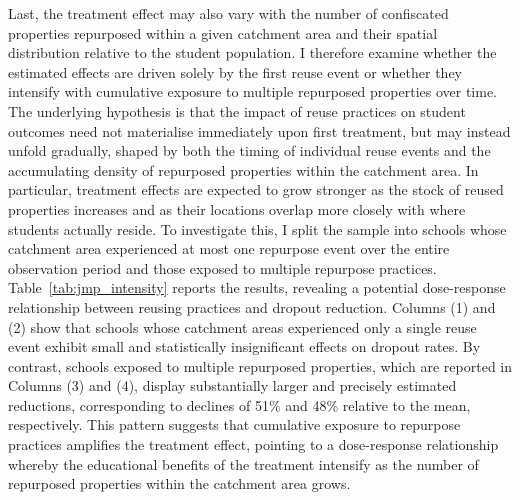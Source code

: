 \documentclass[12pt]{article}
\theoremstyle{plain}
\theoremstyle{plain}
\theoremstyle{plain}
\theoremstyle{definition}
\theoremstyle{plain}
\theoremstyle{definition}
\theoremstyle{plain}
\theoremstyle{remark}
\theoremstyle{definition}
\theoremstyle{definition}
\theoremstyle{plain}
\begin{document}
Last, the treatment effect may also vary with the number of confiscated properties repurposed within a given catchment area and their spatial distribution relative to the student population. I therefore examine whether the estimated effects are driven solely by the first reuse event or whether they intensify with cumulative exposure to multiple repurposed properties over time. The underlying hypothesis is that the impact of reuse practices on student outcomes need not materialise immediately upon first treatment, but may instead unfold gradually, shaped by both the timing of individual reuse events and the accumulating density of repurposed properties within the catchment area. In particular, treatment effects are expected to grow stronger as the stock of reused properties increases and as their locations overlap more closely with where students actually reside. To investigate this, I split the sample into schools whose catchment area experienced at most one repurpose event over the entire observation period and those exposed to multiple repurpose practices. Table~\ref{tab:jmp_intensity} reports the results, revealing a potential dose-response relationship between reusing practices and dropout reduction. Columns (1) and (2) show that schools whose catchment areas experienced only a single reuse event exhibit small and statistically insignificant effects on dropout rates. By contrast, schools exposed to multiple repurposed properties, which are reported in Columns (3) and (4), display substantially larger and precisely estimated reductions, corresponding to declines of 51\% and 48\% relative to the mean, respectively. This pattern suggests that cumulative exposure to repurpose practices amplifies the treatment effect, pointing to a dose-response relationship whereby the educational benefits of the treatment intensify as the number of repurposed properties within the catchment area grows.  \par
\medskip
\end{document}
